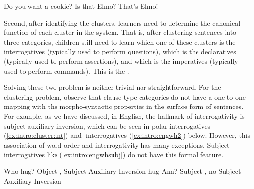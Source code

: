 Do you want a cookie?
\eex
{}
\bxl\label{ex:intro:cluster:int}
Is that Elmo?
\ex\label{ex:intro:cluster:dec}
That’s Elmo!
\exl
\eex

\begin{comment}
Meanwhile, Mandarin-acquiring children have to figure out that \ref{ex:intro:man:cluster-base}

\bex{ex:intro:man:cluster}
\eex
\bex{ex:intro:man:cluster-base}
\bxl
\gll Zhe shi Elmo.\\
This is Elmo\\
\trans ``This is Elmo." \hfill Declarative
\ex 
\gll Zhe shi Elmo \tbf{ma}?\\
This is Elmo \Sfp\\
\trans ``Is that Elmo?'' \hfill Interrogative
\exl
\eex
\end{comment}

Second, after identifying the clusters, learners need to determine the canonical function of each cluster in the system. That is, after clustering sentences into three categories, children still need to learn which one of these clusters is the interrogatives (typically used to perform questions), which is the declaratives (typically used to perform assertions), and which is the imperatives (typically used to perform commands). This is the . %


Solving these two problem is neither trivial nor straightforward. For the clustering problem, observe that clause type categories do not have a one-to-one mapping with the morpho-syntactic properties in the surface form of sentences. For example, as we have discussed, in English, the hallmark of interrogativity is subject-auxiliary inversion, which can be seen in polar interrogatives (\ref{ex:intro:cluster:int}) and \twh-interrogatives (\ref{ex:intro:engwh2}) below. However, this association of word order and interrogativity has many exceptions. Subject \twh-interrogatives like (\ref{ex:intro:engwhsubj}) do not have this formal feature.


Who   hug? \hfill Object \twh{}, Subject-Auxiliary Inversion
\eex
{}
  hug Ann? \hfill Subject \twh{}, no Subject-Auxiliary Inversion
\eex

